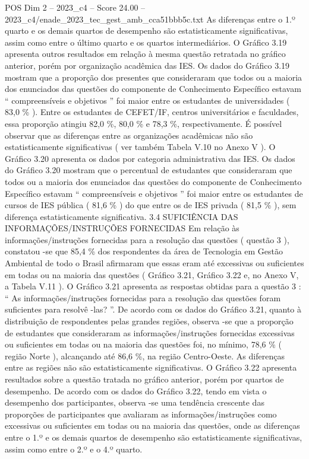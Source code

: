\begin{textsample}{POS Dim 2 – 2023\_c4 – Score 24.00 – 2023\_c4/enade\_2023\_tec\_gest\_amb\_cca51bbb5c.txt}
As diferenças entre o 1.º quarto e os demais quartos de desempenho são estatisticamente significativas, assim como entre o último quarto e os quartos intermediários.
O Gráfico 3.19 apresenta outros resultados em relação à mesma questão retratada no gráfico anterior, porém por organização acadêmica das IES.
Os dados do Gráfico 3.19 mostram que a proporção dos presentes que consideraram que todos ou a maioria dos enunciados das questões do componente de Conhecimento Específico estavam “ compreensíveis e objetivos ” foi maior entre os estudantes de universidades ( 83,0 \% ).
Entre os estudantes de CEFET/IF, centros universitários e faculdades, essa proporção atingiu 82,0 \%, 80,0 \% e 78,3 \%, respectivamente.
É possível observar que as diferenças entre as organizações acadêmicas não são estatisticamente significativas ( ver também Tabela V.10 no Anexo V ).
O Gráfico 3.20 apresenta os dados por categoria administrativa das IES.
Os dados do Gráfico 3.20 mostram que o percentual de estudantes que consideraram que todos ou a maioria dos enunciados das questões do componente de Conhecimento Específico estavam “ compreensíveis e objetivos ” foi maior entre os estudantes de cursos de IES pública ( 81,6 \% ) do que entre os de IES privada ( 81,5 \% ), sem diferença estatisticamente significativa. 3.4 SUFICIÊNCIA DAS INFORMAÇÕES/INSTRUÇÕES FORNECIDAS Em relação às informações/instruções fornecidas para a resolução das questões ( questão 3 ), constatou -se que 85,4 \% dos respondentes da área de Tecnologia em Gestão Ambiental de todo o Brasil afirmaram que essas eram até excessivas ou suficientes em todas ou na maioria das questões ( Gráfico 3.21, Gráfico 3.22 e, no Anexo V, a Tabela V.11 ).
O Gráfico 3.21 apresenta as respostas obtidas para a questão 3 : “ As informações/instruções fornecidas para a resolução das questões foram suficientes para resolvê -las? ”.
De acordo com os dados do Gráfico 3.21, quanto à distribuição de respondentes pelas grandes regiões, observa -se que a proporção de estudantes que consideraram as informações/instruções fornecidas excessivas ou suficientes em todas ou na maioria das questões foi, no mínimo, 78,6 \% ( região Norte ), alcançando até 86,6 \%, na região Centro-Oeste.
As diferenças entre as regiões não são estatisticamente significativas.
O Gráfico 3.22 apresenta resultados sobre a questão tratada no gráfico anterior, porém por quartos de desempenho.
De acordo com os dados do Gráfico 3.22, tendo em vista o desempenho dos participantes, observa -se uma tendência crescente das proporções de participantes que avaliaram as informações/instruções como excessivas ou suficientes em todas ou na maioria das questões, onde as diferenças entre o 1.º e os demais quartos de desempenho são estatisticamente significativas, assim como entre o 2.º e o 4.º quarto.

\end{textsample}
